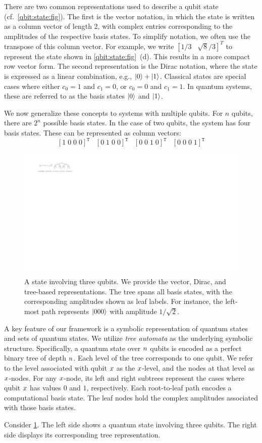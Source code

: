 There are two common representations used to describe a qubit state (cf.\ \cref{qbit:state:fig}).
%
The first is the vector notation, in which the state is written as a column vector of length 2, with complex entries corresponding to the amplitudes of the respective basis states.
%
To simplify notation, we often use the transpose of this column vector.
%
For example, we write $[1/3\;\;\;\sqrt{8}/3]^T$ to represent the state shown in \cref{qbit:state:fig}~(d).
%
This results in a more compact row vector form.
%
The second representation is the Dirac notation, where the state is expressed as a linear combination, e.g., $|0\rangle + |1\rangle$.
%
Classical states are special cases where either $c_0 = 1$ and $c_1 = 0$, or $c_0 = 0$ and $c_1 = 1$.
%
In quantum systems, these are referred to as the basis states $|0\rangle$ and $|1\rangle$.

We now generalize these concepts to systems with multiple qubits.
%
For $n$ qubits, there are $2^n$ possible basis states.
%
%
In the case of two qubits, the system has four basis states.
%
These can be represented as column vectors:
\[
\left[
1\;0\;0\;0
\right]^{\mathtt T}
\;\;\;
\left[
0\;1\;0\;0
\right]^{\mathtt T}
\;\;\;
\left[
0\;0\;1\;0
\right]^{\mathtt T}
\;\;\;
\left[
0\;0\;0\;1
\right]^{\mathtt T}
\]

\begin{figure}
\includegraphics[scale=1]{Figures/States/state3}
\caption{A state involving three qubits.  We provide the vector, Dirac, and tree-based representations.
%
The tree spans all basis states, with the corresponding amplitudes shown as leaf labels.
%
For instance, the left-most path represents $|000\rangle$ with amplitude $1/\sqrt{2}$.
}
\label{triple:qbit:state:fig}
\end{figure}


A key feature of our framework is a symbolic representation of quantum states and sets of quantum states.
%
We utilize {\it tree automata} as the underlying symbolic structure.
%
Specifically, a quantum state over $n$ qubits is encoded as a perfect binary tree of depth $n$.
%
Each level of the tree corresponds to one qubit.
%
We refer to the level associated with qubit $x$ as the $x$-level, and the nodes at that level as $x$-nodes.
%
For any $x$-node, its left and right subtrees represent the cases where qubit $x$ has values $0$ and $1$, respectively.
%
Each root-to-leaf path encodes a computational basis state.
%
The leaf nodes hold the complex amplitudes associated with those basis states.

Consider \cref{triple:qbit:state:fig}.
%
The left side shows a quantum state involving three qubits.
%
The right side displays its corresponding tree representation.
%
